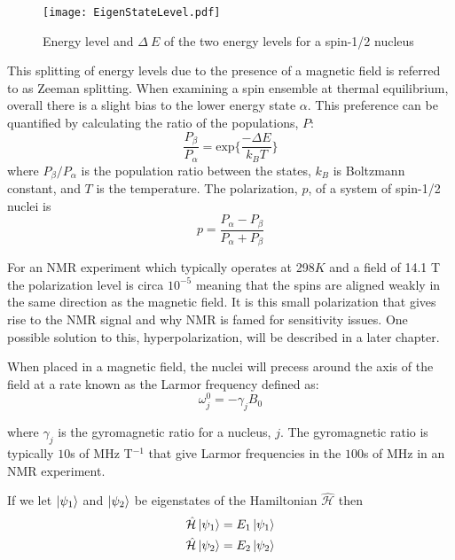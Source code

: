 \begin{figure}
  \begin{center}
  \texttt{[image: EigenStateLevel.pdf]}
  \end{center}
  \caption{Energy level and $\Delta~E$ of the two energy levels for a spin-1/2 nucleus}
  \label{fig:EnergySplit}
\end{figure}

This splitting of energy levels due to the presence of a magnetic field is referred to as Zeeman splitting.
When examining a spin ensemble at thermal equilibrium, overall there is a slight bias to the lower energy
state $\alpha$. This preference can be quantified by calculating the ratio of the populations, $P$:
\begin{equation}\label{eqn:Boltzmann}
  \frac{P_{\beta}}{P_{\alpha}} = \text{exp}\{\frac{-\Delta{E}}{k_B T}\}
\end{equation}
where $P_{\beta}/P_{\alpha}$ is the population ratio between the states, $k_B$ is Boltzmann constant, and $T$ is the temperature. The polarization, $p$, of a system of
spin-1/2 nuclei is
\begin{equation}\label{eqn:Polarisation}
  p = \frac{P_\alpha - P_\beta}{P_\alpha + P_\beta}
\end{equation}

For an NMR experiment which typically operates at 298$K$ and
a field of 14.1 T the polarization level is circa $10^{-5}$ meaning that the spins are aligned weakly
in the same direction as the magnetic field. It is this small polarization that gives rise to the NMR
signal and why NMR is famed for sensitivity issues. One possible solution to this, hyperpolarization, will be described in a later chapter.

When placed in a magnetic field, the nuclei will precess around the axis of the field at a rate known as the Larmor frequency defined as:
\begin{equation}\label{eqn:Larmor}
  \omega_j^0 = -\gamma_jB_0
\end{equation}

where $\gamma_j$ is the gyromagnetic ratio for a nucleus, $j$. The gyromagnetic ratio is
typically $10$s of MHz T$^{-1}$ that give Larmor frequencies in the $100$s of MHz in an NMR
experiment.


If we let $\ket{\psi_1}$ and $\ket{\psi_2}$ be eigenstates of the Hamiltonian $\hat{\mathcal{H}}$ then
\begin{align}
  \hat{\mathcal{H}}\ket{\psi_1} = E_1\ket{\psi_1}\\
  \hat{\mathcal{H}}\ket{\psi_2} = E_2\ket{\psi_2}
\end{align}

